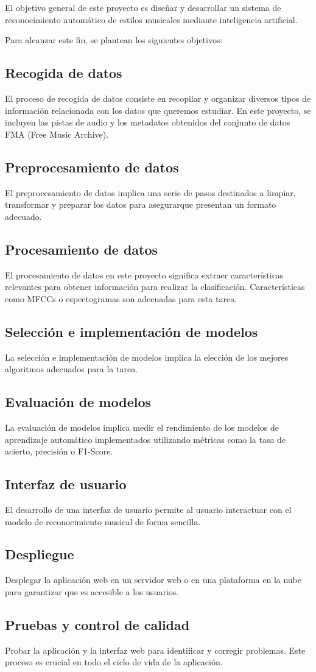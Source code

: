 El objetivo general de este proyecto es diseñar y desarrollar un sistema de reconocimiento automático de estilos musicales mediante inteligencia artificial.

Para alcanzar este fin, se plantean los siguientes objetivos:

\subsection{Recogida de datos}
El proceso de recogida de datos consiste en recopilar y organizar diversos tipos de información relacionada con los datos que queremos estudiar. En este proyecto, se incluyen las pistas de audio y los metadatos obtenidos del conjunto de datos FMA (Free Music Archive).
\subsection{Preprocesamiento de datos}
El preprocesamiento de datos implica una serie de pasos destinados a limpiar, transformar y preparar los datos para asegurarque presentan un formato adecuado.
\subsection{Procesamiento de datos}
El procesamiento de datos en este proyecto significa extraer características relevantes para obtener información para realizar la clasificación. Características como MFCCs o espectogramas son adecuadas para esta tarea.
\subsection{Selección e implementación de modelos}
La selección e implementación de modelos implica la elección de los mejores algoritmos adecuados para la tarea.
\subsection{Evaluación de modelos}
La evaluación de modelos implica medir el rendimiento de los modelos de aprendizaje automático implementados utilizando métricas como la tasa de acierto, precisión o F1-Score.
\subsection{Interfaz de usuario}
El desarrollo de una interfaz de usuario permite al usuario interactuar con el modelo de reconocimiento musical de forma sencilla.
\subsection{Despliegue}
Desplegar la aplicación web en un servidor web o en una plataforma en la nube para garantizar que es accesible a los usuarios.
\subsection{Pruebas y control de calidad}
Probar la aplicación y la interfaz web para identificar y corregir problemas. Este proceso es crucial en todo el ciclo de vida de la aplicación.